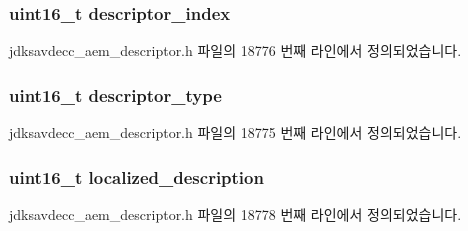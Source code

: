\subsubsection[{\texorpdfstring{descriptor\+\_\+index}{descriptor_index}}]{\setlength{\rightskip}{0pt plus 5cm}uint16\+\_\+t descriptor\+\_\+index}\hypertarget{structjdksavdecc__descriptor__control_a042bbc76d835b82d27c1932431ee38d4}{}\label{structjdksavdecc__descriptor__control_a042bbc76d835b82d27c1932431ee38d4}


jdksavdecc\+\_\+aem\+\_\+descriptor.\+h 파일의 18776 번째 라인에서 정의되었습니다.

\subsubsection[{\texorpdfstring{descriptor\+\_\+type}{descriptor_type}}]{\setlength{\rightskip}{0pt plus 5cm}uint16\+\_\+t descriptor\+\_\+type}\hypertarget{structjdksavdecc__descriptor__control_ab7c32b6c7131c13d4ea3b7ee2f09b78d}{}\label{structjdksavdecc__descriptor__control_ab7c32b6c7131c13d4ea3b7ee2f09b78d}


jdksavdecc\+\_\+aem\+\_\+descriptor.\+h 파일의 18775 번째 라인에서 정의되었습니다.

\subsubsection[{\texorpdfstring{localized\+\_\+description}{localized_description}}]{\setlength{\rightskip}{0pt plus 5cm}uint16\+\_\+t localized\+\_\+description}\hypertarget{structjdksavdecc__descriptor__control_a0926f846ca65a83ad5bb06b4aff8f408}{}\label{structjdksavdecc__descriptor__control_a0926f846ca65a83ad5bb06b4aff8f408}


jdksavdecc\+\_\+aem\+\_\+descriptor.\+h 파일의 18778 번째 라인에서 정의되었습니다.

